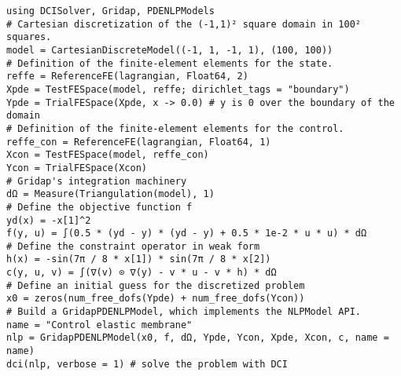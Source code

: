 \documentclass[11pt]{minimal}
\begin{document}
\begin{verbatim}
using DCISolver, Gridap, PDENLPModels
# Cartesian discretization of the (-1,1)² square domain in 100² squares.
model = CartesianDiscreteModel((-1, 1, -1, 1), (100, 100))
# Definition of the finite-element elements for the state.
reffe = ReferenceFE(lagrangian, Float64, 2)
Xpde = TestFESpace(model, reffe; dirichlet_tags = "boundary")
Ypde = TrialFESpace(Xpde, x -> 0.0) # y is 0 over the boundary of the domain
# Definition of the finite-element elements for the control.
reffe_con = ReferenceFE(lagrangian, Float64, 1)
Xcon = TestFESpace(model, reffe_con)
Ycon = TrialFESpace(Xcon)
# Gridap's integration machinery
dΩ = Measure(Triangulation(model), 1)
# Define the objective function f
yd(x) = -x[1]^2
f(y, u) = ∫(0.5 * (yd - y) * (yd - y) + 0.5 * 1e-2 * u * u) * dΩ
# Define the constraint operator in weak form
h(x) = -sin(7π / 8 * x[1]) * sin(7π / 8 * x[2])
c(y, u, v) = ∫(∇(v) ⊙ ∇(y) - v * u - v * h) * dΩ
# Define an initial guess for the discretized problem
x0 = zeros(num_free_dofs(Ypde) + num_free_dofs(Ycon))
# Build a GridapPDENLPModel, which implements the NLPModel API.
name = "Control elastic membrane"
nlp = GridapPDENLPModel(x0, f, dΩ, Ypde, Ycon, Xpde, Xcon, c, name = name)
dci(nlp, verbose = 1) # solve the problem with DCI
\end{verbatim}   
\end{document}
